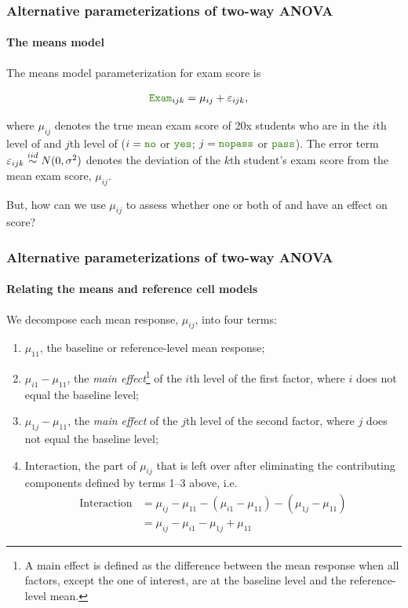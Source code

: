 \documentclass{beamer}\usepackage[]{graphicx}\usepackage[]{xcolor}
\begin{document}
\begin{frame}[fragile]
\frametitle{Alternative parameterizations of two-way ANOVA}
\framesubtitle{The means model}

The means model parameterization for exam score is

\vspace{-5mm}

\begin{align*}
\rcode{Exam}_{ijk} &= \mu_{ij} + \varepsilon_{ijk},
\end{align*}

\vspace{-5mm}

where $\mu_{ij}$ denotes the true mean exam score of 20x students who are in the $i$th level of  and $j$th level of  ($i=\rcode{no}$ or $\rcode{yes}$; $j=\rcode{nopass}$ or $\rcode{pass}$). The error term $\varepsilon_{ijk} \stackrel{iid}{\sim} N(0, \sigma^2)$ denotes the deviation of the $k$th student's exam score from the mean exam score, $\mu_{ij}$.

\bigskip

But, how can we use $\mu_{ij}$ to assess whether one or both of  and  have an effect on  score? 

\end{frame}


\begin{frame}[fragile]
\frametitle{Alternative parameterizations of two-way ANOVA}
\framesubtitle{Relating the means and reference cell models}

\medskip

We decompose each mean response, $\mu_{ij}$, into four terms:

\medskip

\begin{enumerate}
\setlength\itemsep{0.55em}
  \item $\mu_{11}$, the baseline or reference-level mean response;
  \item $\mu_{i1}-\mu_{11}$, the {\em main effect}\footnote{A main effect is defined as the difference between the mean response when all factors, except the one of interest, are at the baseline level and the reference-level mean.} of the $i$th level of the first factor, where $i$ does not equal the baseline level;
  \item $\mu_{1j}-\mu_{11}$, the {\em main effect} of the $j$th level of the second factor, where $j$ does not equal the baseline level;
  \item $\text{Interaction}$, the part of $\mu_{ij}$ that is left over after eliminating the contributing components defined by terms 1--3 above, i.e.
  \begin{align*}
    \text{Interaction} &= \mu_{ij} - \mu_{11} - (\mu_{i1}-\mu_{11}) - (\mu_{1j}-\mu_{11}) \\
                       &= \mu_{ij} - \mu_{i1} - \mu_{1j} + \mu_{11}
  \end{align*}
  
\end{enumerate}

\end{frame}
\end{document}
